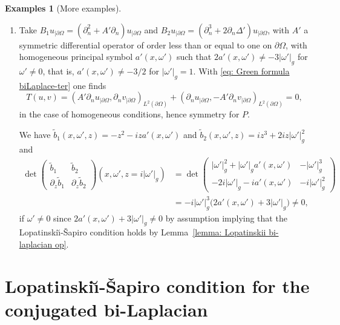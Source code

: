 \documentclass[JEP,XML,SOM,Unicode,published]{cedram}
\theoremstyle{plain}
\theoremstyle{definition}
\newtheorem{examples}[theorem]{Examples}
\newcommand{\LS}{Lopatinski\u{\i}-\v{S}apiro\xspace}
\newcommand{\inp}[2]{(#1, #2)}
\newcommand{\bd}{\ensuremath{_{|\partial\Omega}}}
\begin{document}
\begin{examples}[More examples]
\begin{enumerate}
\item Take $B_1 u\bd = (\partial_n^2 + A' \partial_n) u\bd$ and $B_2 u\bd
= (\partial_n^3+ 2 \partial_n\Delta') u\bd$, with $A'$ a symmetric differential
operator of order less than or equal to one on
$\partial \Omega$, with homogeneous principal symbol $a'(x,\omega')$ such that
$2 a'(x,\omega') \neq - 3 |\omega'|_g $ for $\omega' \neq 0$, that
is, $a'(x,\omega')\neq -3/2$ for $|\omega'|_g=1$.
With \eqref{eq: Green formula biLaplace-ter} one
finds
\begin{equation*}
T(u,v)
= \inp{A' \partial_n u\bd}{\partial_n v\bd}_{L^2(\partial\Omega)}
+ \inp{\partial_n u\bd}{- A' \partial_n v\bd}_{L^2(\partial\Omega)}
=0,
\end{equation*}
in the case of homogeneous conditions, hence symmetry for $P$.

We have $\tilde{b}_1(x,\omega',z)=-z^2 -i z a'(x,\omega')$ and
$\tilde{b}_2(x,\omega',z)=iz^3 + 2 i z |\omega'|_g^2$ and
\begin{align*}
\det
\begin{pmatrix}
\tilde{b}_1 &\tilde{b}_2 \\[
2pt]
\partial_z\tilde{b}_1& \partial_z\tilde{b}_2
\end{pmatrix} (x,\omega',z=i|\omega'|_g)
& =
\det
\begin{pmatrix}
|\omega'|^2_g + |\omega'|_g a'(x,\omega')&-|\omega'|^3_g \\[
2pt]
-2i|\omega'|_g - i a'(x,\omega')&-i|\omega'|^2_g
\end{pmatrix} \\
& =- i |\omega'|^3_g \big(2 a'(x,\omega') + 3 |\omega'|_g\big) \neq 0,
\end{align*}
if $\omega'\neq 0$ since $2 a'(x,\omega') + 3 |\omega'|_g \neq 0$ by
assumption implying that the \LS condition holds by Lemma~\ref{lemma: Lopatinskii bi-laplacian op}.
\end{enumerate}
\end{examples}

\section{Lopatinski\u{\i}-\v{S}apiro condition for the conjugated
bi-Laplacian}
\label{sec: LS condition for conjugated bilaplace}
\end{document}
